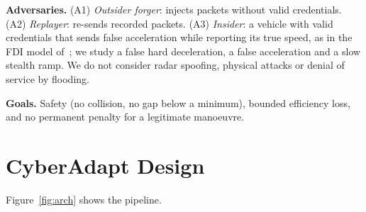 \documentclass[journal]{IEEEtran}
\begin{document}
\textbf{Adversaries.} (A1) \emph{Outsider forger}: injects packets without valid credentials. (A2) \emph{Replayer}: re-sends recorded packets. (A3) \emph{Insider}: a vehicle with valid credentials that sends false acceleration while reporting its true speed, as in the FDI model of~\cite{lyons2026}; we study a false hard deceleration, a false acceleration and a slow stealth ramp. We do not consider radar spoofing, physical attacks or denial of service by flooding.

\textbf{Goals.} Safety (no collision, no gap below a minimum), bounded efficiency loss, and no permanent penalty for a legitimate manoeuvre.

\section{CyberAdapt Design}\label{sec:design}
Figure~\ref{fig:arch} shows the pipeline.
\end{document}
